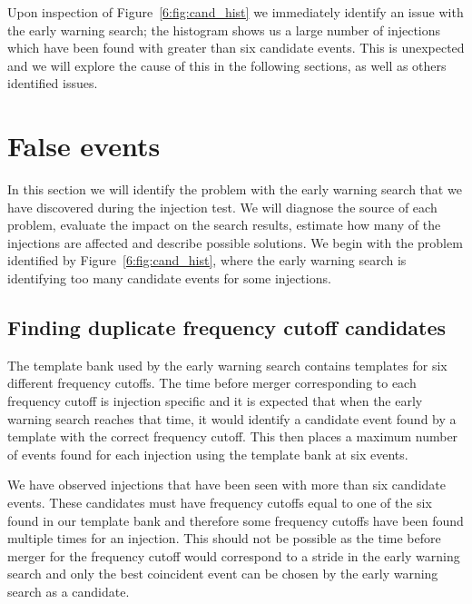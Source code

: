 Upon inspection of Figure~\ref{6:fig:cand_hist} we immediately identify an issue with the early warning search; the histogram shows us a large number of injections which have been found with greater than six candidate events. This is unexpected and we will explore the cause of this in the following sections, as well as others identified issues.

\section{\label{6:sec:false-problems}False events}

In this section we will identify the problem with the early warning search that we have discovered during the injection test. We will diagnose the source of each problem, evaluate the impact on the search results, estimate how many of the injections are affected and describe possible solutions. We begin with the problem identified by Figure~\ref{6:fig:cand_hist}, where the early warning search is identifying too many candidate events for some injections.

\subsection{\label{6:sec:duplicate-frequency-cands}Finding duplicate frequency cutoff candidates}


The template bank used by the early warning search contains templates for six different frequency cutoffs. The time before merger corresponding to each frequency cutoff is injection specific and it is expected that when the early warning search reaches that time, it would identify a candidate event found by a template with the correct frequency cutoff. This then places a maximum number of events found for each injection using the template bank at six events.

We have observed injections that have been seen with more than six candidate events. These candidates must have frequency cutoffs equal to one of the six found in our template bank and therefore some frequency cutoffs have been found multiple times for an injection. This should not be possible as the time before merger for the frequency cutoff would correspond to a stride in the early warning search and only the best coincident event can be chosen by the early warning search as a candidate.

